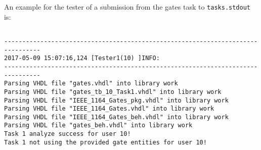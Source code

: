 An example for the tester of a submission from the gates task to {\tt tasks.stdout} is:
{\scriptsize
\begin{verbatim}

--------------------------------------------------------------------------------
2017-05-09 15:07:16,124 [Tester1(10) ]INFO:
--------------------------------------------------------------------------------
Parsing VHDL file "gates.vhdl" into library work
Parsing VHDL file "gates_tb_10_Task1.vhdl" into library work
Parsing VHDL file "IEEE_1164_Gates_pkg.vhdl" into library work
Parsing VHDL file "IEEE_1164_Gates.vhdl" into library work
Parsing VHDL file "IEEE_1164_Gates_beh.vhdl" into library work
Parsing VHDL file "gates_beh.vhdl" into library work
Task 1 analyze success for user 10!
Task 1 not using the provided gate entities for user 10!
\end{verbatim}
}
